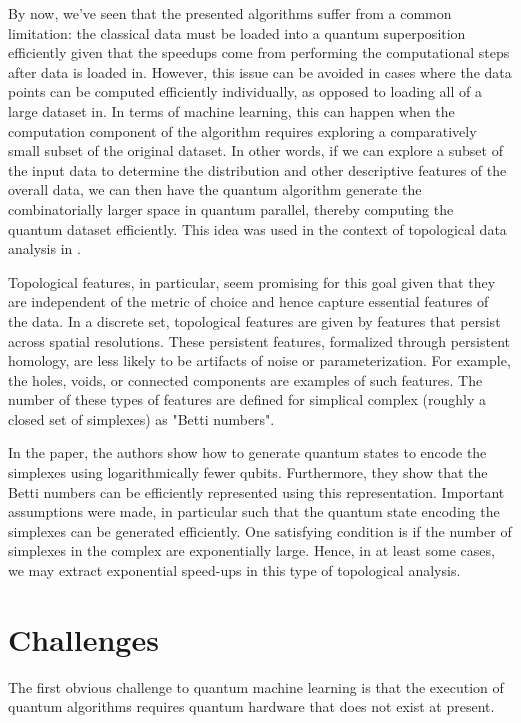 \documentclass[main.tex]{subfiles}
\begin{document}
By now, we've seen that the presented algorithms suffer from a common limitation: the classical data must be loaded into a quantum superposition efficiently given that the speedups come from performing the computational steps after data is loaded in. However, this issue can be avoided in cases where the data points can be computed efficiently individually, as opposed to loading all of a large dataset in. In terms of machine learning, this can happen when the computation component of the algorithm requires exploring a comparatively small subset of the original dataset. In other words, if we can explore a subset of the input data to determine the distribution and other descriptive features of the overall data, we can then have the quantum algorithm generate the combinatorially larger space in quantum parallel, thereby computing the quantum dataset efficiently. This idea was used in the context of topological data analysis in \cite{lloyd2016quantum}.

Topological features, in particular, seem promising for this goal given that they are independent of the metric of choice and hence capture essential features of the data. In a discrete set, topological features are given by features that persist across spatial resolutions. These persistent features, formalized through persistent homology, are less likely to be artifacts of noise or parameterization. For example, the holes, voids, or connected components are examples of such features. The number of these types of features are defined for simplical complex (roughly a closed set of simplexes) as "Betti numbers". 

In the paper, the authors show how to generate quantum states to encode the simplexes using logarithmically fewer qubits. Furthermore, they show that the Betti numbers can be efficiently represented using this representation. Important assumptions were made, in particular such that the quantum state encoding the simplexes can be generated efficiently. One satisfying condition is if the number of simplexes in the complex are exponentially large. Hence, in at least some cases, we may extract exponential speed-ups in this type of topological analysis.

\section{Challenges}

The first obvious challenge to quantum machine learning is that the execution of quantum algorithms requires quantum hardware that does not exist at present. 
\end{document}
